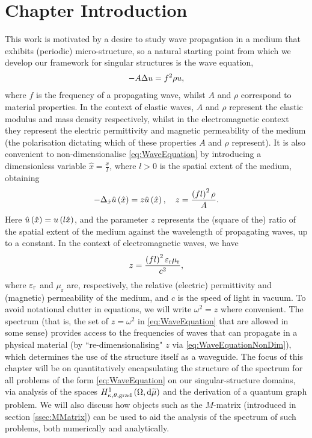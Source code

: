\section{Chapter Introduction} \label{sec:ScalarEqnChapterIntro}
This work is motivated by a desire to study wave propagation in a medium that exhibits (periodic) micro-structure, so a natural starting point from which we develop our framework for singular structures is the wave equation,
\begin{align} \label{eq:WaveEquation}
	- A \Delta u = f^2 \rho u,
\end{align}
where $f$ is the frequency of a propagating wave, whilst $A$ and $\rho$ correspond to material properties.
In the context of elastic waves, $A$ and $\rho$ represent the elastic modulus and mass density respectively, whilst in the electromagnetic context they represent the electric permittivity and magnetic permeability of the medium (the polarisation dictating which of these properties $A$ and $\rho$ represent).
It is also convenient to non-dimensionalise \eqref{eq:WaveEquation} by introducing a dimensionless variable $\hat{x} = \frac{x}{l}$, where $l>0$ is the spatial extent of the medium, obtaining
\begin{align} \label{eq:WaveEquationNonDim}
	- \Delta_{\hat{x}}\hat{u}\left( \hat{x} \right) = z \hat{u}\left( \hat{x} \right),
	\quad
	z = \frac{\left( fl \right)^2\rho}{A}.
\end{align} 
Here $\hat{u}\left( \hat{x} \right) = u\left( l\hat{x} \right)$, and the parameter $z$ represents the (square of the) ratio of the spatial extent of the medium against the wavelength of propagating waves, up to a constant.
In the context of electromagnetic waves, we have
\begin{align*}
	z = \frac{\left( fl \right)^2\varepsilon_{\mathrm{r}}\mu_{\mathrm{r}}}{c^2},
\end{align*}
where $\varepsilon_{\mathrm{r}}$ and $\mu_{\mathrm{r}}$ are, respectively, the relative (electric) permittivity and (magnetic) permeability of the medium, and $c$ is the speed of light in vacuum. 
To avoid notational clutter in equations, we will write $\omega^2=z$ where convenient.
The spectrum (that is, the set of $z=\omega^2$ in \eqref{eq:WaveEquation} that are allowed in some sense)  provides access to the frequencies of waves that can propagate in a physical material (by ``re-dimensionalising" $z$ via \eqref{eq:WaveEquationNonDim}), which determines the use of the structure itself as a waveguide.
The focus of this chapter will be on quantitatively encapsulating the structure of the spectrum for all problems of the form \eqref{eq:WaveEquation} on our singular-structure domains, via analysis of the spaces $H^1_{\kappa,\theta,\mathrm{grad}}\left( \Omega, \mathrm{d}\widetilde{\mu} \right)$ and the derivation of a quantum graph problem.
We will also discuss how objects such as the $M$-matrix (introduced in section \ref{ssec:MMatrix}) can be used to aid the analysis of the spectrum of such problems, both numerically and analytically.

